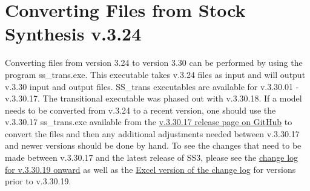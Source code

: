 \hypertarget{ConvIssues}{}
\section{Converting Files from Stock Synthesis v.3.24}
Converting files from version 3.24 to version 3.30 can be performed by using the program ss\_trans.exe. This executable takes v.3.24 files as input and will output v.3.30 input and output files. SS\_trans executables are available for v.3.30.01 - v.3.30.17. The transitional executable was phased out with v.3.30.18. If a model needs to be converted from v.3.24 to a recent version, one should use the v.3.30.17 ss\_trans.exe available from the \href{https://github.com/nmfs-ost/ss3-source-code/releases/tag/v3.30.17}{v.3.30.17 release page on GitHub} to convert the files and then any additional adjustments needed between v.3.30.17 and newer versions should be done by hand.  To see the changes that need to be made between v.3.30.17 and the latest release of SS3, please see the \href{https://github.com/orgs/nmfs-ost/projects/11}{change log for v.3.30.19 onward} as well as the \href{https://github.com/nmfs-ost/ss3-source-code/blob/v3.30.19/Change_log_for_SS_3.30.xlsx?raw=true}{Excel version of the change log} for versions prior to v.3.30.19.

